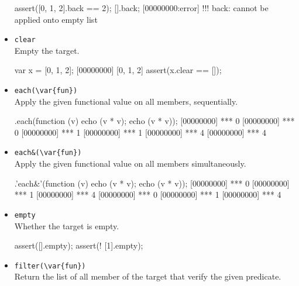 \begin{itemize}
\begin{urbiscript}[firstnumber=last]
assert([0, 1, 2].back == 2);
[].back;
[00000000:error] !!! back: cannot be applied onto empty list
\end{urbiscript}

\item \lstinline|clear|\\
  Empty the target.

\begin{urbiscript}[firstnumber=last]
var x = [0, 1, 2];
[00000000] [0, 1, 2]
assert(x.clear == []);
\end{urbiscript}

\item \lstinline|each(\var{fun})|\\
  Apply the given functional value  on all members,
  sequentially.

\begin{urbiscript}[firstnumber=last]
[0, 1, 2].each(function (v) {echo (v * v); echo (v * v)});
[00000000] *** 0
[00000000] *** 0
[00000000] *** 1
[00000000] *** 1
[00000000] *** 4
[00000000] *** 4
\end{urbiscript}

\item \lstinline|each&(\var{fun})|\\
Apply the given functional value on all members simultaneously.

\begin{urbiscript}[firstnumber=last]
[0, 1, 2].'each&'(function (v) {echo (v * v); echo (v * v)});
[00000000] *** 0
[00000000] *** 1
[00000000] *** 4
[00000000] *** 0
[00000000] *** 1
[00000000] *** 4
\end{urbiscript}

\item \lstinline|empty|\\
  Whether the target is empty.

\begin{urbiscript}[firstnumber=last]
assert([].empty);
assert(! [1].empty);
\end{urbiscript}

\item \lstinline|filter(\var{fun})|\\
  Return the list of all member of the target that verify the given
  predicate.



\end{itemize}
